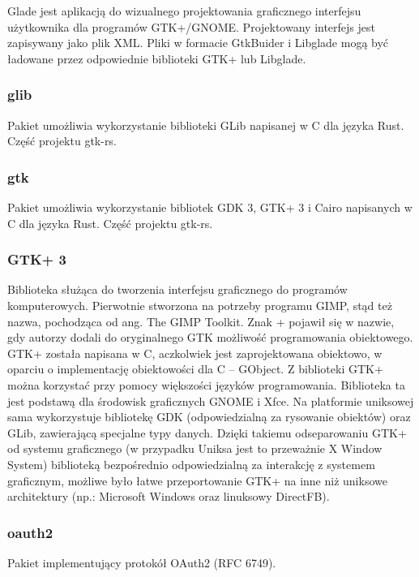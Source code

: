 \documentclass[12pt,a4paper]{article}
\begin{document}
					\indent Glade jest aplikacją do wizualnego projektowania graficznego interfejsu użytkownika dla programów GTK+/GNOME.
					Projektowany interfejs jest zapisywany jako plik XML. Pliki w formacie GtkBuider i Libglade mogą być ładowane przez odpowiednie biblioteki GTK+ lub Libglade. 
				\subsubsection{glib}

					\indent  Pakiet umożliwia wykorzystanie biblioteki GLib napisanej w C dla języka Rust. Część projektu gtk-rs.
				\subsubsection{gtk}

					\indent Pakiet umożliwia wykorzystanie bibliotek GDK 3, GTK+ 3 i Cairo napisanych w C dla języka Rust. Część projektu gtk-rs.
				\subsubsection{GTK+ 3}

					\indent  Biblioteka służąca do tworzenia interfejsu graficznego do programów komputerowych. Pierwotnie stworzona na potrzeby programu GIMP,
					stąd też nazwa, pochodząca od ang. The GIMP Toolkit. Znak + pojawił się w nazwie, gdy autorzy dodali do oryginalnego GTK możliwość programowania obiektowego.
					GTK+ została napisana w C, aczkolwiek jest zaprojektowana obiektowo, w oparciu o implementację obiektowości dla C – GObject. Z biblioteki GTK+ można korzystać
					przy pomocy większości języków programowania. Biblioteka ta jest podstawą dla środowisk graficznych GNOME i Xfce. Na platformie uniksowej sama wykorzystuje
					bibliotekę GDK (odpowiedzialną za rysowanie obiektów) oraz GLib, zawierającą specjalne typy danych. Dzięki takiemu odseparowaniu GTK+ od systemu graficznego
					(w przypadku Uniksa jest to przeważnie X Window System) biblioteką bezpośrednio odpowiedzialną za interakcję z systemem graficznym, możliwe było łatwe
					przeportowanie GTK+ na inne niż uniksowe architektury (np.: Microsoft Windows oraz linuksowy DirectFB).
				\subsubsection{oauth2}

					\indent Pakiet implementujący protokół OAuth2 (RFC 6749).
				
\end{document}
